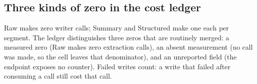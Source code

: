 \subsection{Three kinds of zero in the cost ledger}
\label{sec:zeros}
Raw makes zero writer calls; Summary and Structured make one each per
segment. The ledger distinguishes three zeros that are routinely merged: a
measured zero (Raw makes zero extraction calls), an absent measurement (no
call was made, so the cell leaves that denominator), and an unreported field
(the endpoint exposes no counter). Failed writes count: a write that failed
after consuming a call still cost that call.
